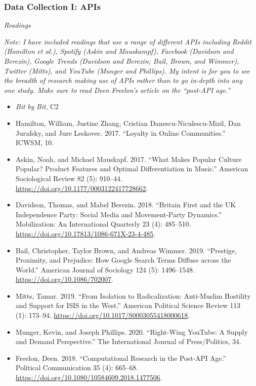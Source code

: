 \documentclass[
  10pt,
]{article}
\providecommand{\tightlist}{%
  \setlength{\itemsep}{0pt}\setlength{\parskip}{0pt}}
\begin{document}
\hypertarget{data-collection-i-apis}{%
\subsubsection{Data Collection I: APIs}\label{data-collection-i-apis}}

\emph{Readings}

\emph{Note: I have included readings that use a range of different APIs
including Reddit (Hamilton et al.), Spotify (Askin and Mauskampf),
Facebook (Davidson and Berezin), Google Trends (Davidson and Berezin;
Bail, Brown, and Wimmer), Twitter (Mitts), and YouTube (Munger and
Phillips). My intent is for you to see the breadth of research making
use of APIs rather than to go in-depth into any one study. Make sure to
read Deen Freelon's article on the ``post-API age.''}

\begin{itemize}
\tightlist
\item
  \emph{Bit by Bit}, C2
\item
  Hamilton, William, Justine Zhang, Cristian Danescu-Niculescu-Mizil,
  Dan Jurafsky, and Jure Leskovec. 2017. ``Loyalty in Online
  Communities.'' ICWSM, 10.
\item
  Askin, Noah, and Michael Mauskapf. 2017. ``What Makes Popular Culture
  Popular? Product Features and Optimal Differentiation in Music.''
  American Sociological Review 82 (5): 910--44.
  \url{https://doi.org/10.1177/0003122417728662}.
\item
  Davidson, Thomas, and Mabel Berezin. 2018. ``Britain First and the UK
  Independence Party: Social Media and Movement-Party Dynamics.''
  Mobilization: An International Quarterly 23 (4): 485--510.
  \url{https://doi.org/10.17813/1086-671X-23-4-485}.
\item
  Bail, Christopher, Taylor Brown, and Andreas Wimmer. 2019. ``Prestige,
  Proximity, and Prejudice: How Google Search Terms Diffuse across the
  World.'' American Journal of Sociology 124 (5): 1496--1548.
  \url{https://doi.org/10.1086/702007}.
\item
  Mitts, Tamar. 2019. ``From Isolation to Radicalization: Anti-Muslim
  Hostility and Support for ISIS in the West.'' American Political
  Science Review 113 (1): 173--94.
  \url{https://doi.org/10.1017/S0003055418000618}.
\item
  Munger, Kevin, and Joseph Phillips. 2020. ``Right-Wing YouTube: A
  Supply and Demand Perspective.'' The International Journal of
  Press/Politics, 34.
\item
  Freelon, Deen. 2018. ``Computational Research in the Post-API Age.''
  Political Communication 35 (4): 665--68.
  \url{https://doi.org/10.1080/10584609.2018.1477506}.
\end{itemize}
\end{document}
